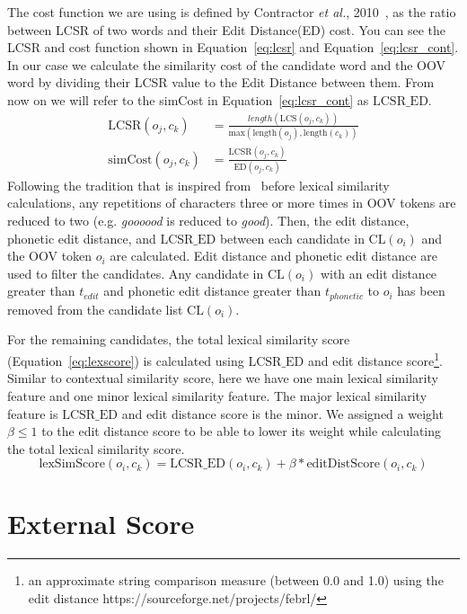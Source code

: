 \documentclass[a4paper,onesided,12pt]{report}
\begin{document}
The cost function we are using is defined by Contractor \textit{et al.}, 2010~\cite{Contractor:2010:UCN:1944566.1944588}, as the ratio between LCSR of two words and their Edit Distance(ED) cost. You can see the LCSR and cost function shown in Equation~\ref{eq:lcsr} and Equation~\ref{eq:lcsr_cont}. In our case we calculate the similarity cost of the candidate word and the OOV word by dividing their LCSR value to the Edit Distance between them. From now on we will refer to the simCost in Equation~\ref{eq:lcsr_cont} as $\text{LCSR\_ED}$.
\begin{align}
\text{LCSR}(o_j,c_k) &= \frac{length(\text{LCS}(o_j,c_k))}{\text{max}(\text{length}(o_j),\text{length}(c_k))} \label{eq:lcsr}      \\
\text{simCost} (o_j,c_k) &= \frac{\text{LCSR}(o_j,c_k)}{\text{ED}(o_j,c_k)} \label{eq:lcsr_cont}
\end{align}
Following the tradition that is inspired from~\cite{Kaufmann2010} before lexical similarity calculations, any repetitions of characters three or more times in OOV tokens are reduced to two (e.g. \emph{goooood} is reduced to \emph{good}). Then, the edit distance, phonetic edit distance, and $\text{LCSR\_ED}$ between each candidate in $\text{CL}(o_{i})$ and the OOV token $o_i$ are calculated. Edit distance and phonetic edit distance are used to filter the candidates. Any candidate in $\text{CL}(o_{i})$ with an edit distance greater than $t_{edit}$ and phonetic edit distance greater than $t_{phonetic}$ to $o_i$ has been removed from the candidate list $\text{CL}(o_{i})$.

For the remaining candidates, the total lexical similarity score (Equation~\ref{eq:lexscore}) is calculated using $\text{LCSR\_ED}$ and edit distance score\footnote{an approximate string comparison measure (between 0.0 and 1.0) using the edit distance https://sourceforge.net/projects/febrl/}. Similar to contextual similarity score, here we have one main lexical similarity feature and one minor lexical similarity feature. The major lexical similarity feature is $\text{LCSR\_ED}$ and edit distance score is the minor. We assigned a weight $\beta \leq 1$ to the edit distance score to be able to lower its weight while calculating the total lexical similarity score.
\begin{equation}
\text{lexSimScore}(o_i,c_k) = \text{LCSR\_ED}(o_i,c_k) + \beta * \text{editDistScore}(o_i,c_k)
\label{eq:lexscore}
\end{equation}

\section{External Score}
\end{document}
